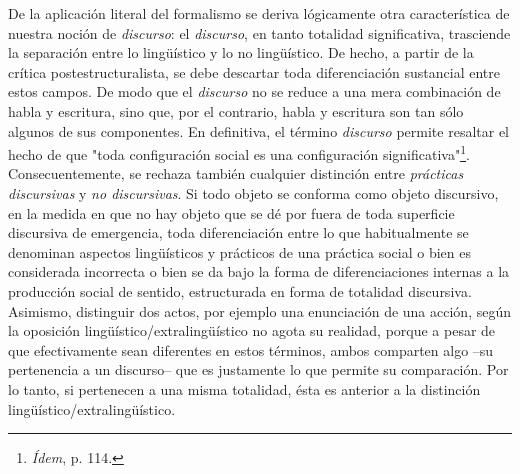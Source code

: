 \documentclass{book}
\begin{document}
De la aplicación literal del formalismo se deriva lógicamente otra
característica de nuestra noción de \emph{discurso}: el \emph{discurso},
en tanto totalidad significativa, trasciende la separación entre lo
lingüístico y lo no lingüístico. De hecho, a partir de la crítica
postestructuralista, se debe descartar toda diferenciación sustancial
entre estos campos. De modo que el \emph{discurso} no se reduce a una
mera combinación de habla y escritura, sino que, por el contrario, habla
y escritura son tan sólo algunos de sus componentes. En definitiva, el
término \emph{discurso} permite resaltar el hecho de que "toda
configuración social es una configuración significativa"\footnote{\emph{Ídem},
  p. 114.}. Consecuentemente, se rechaza también cualquier distinción
entre \emph{prácticas discursivas} y \emph{no discursivas}. Si todo
objeto se conforma como objeto discursivo, en la medida en que no hay
objeto que se dé por fuera de toda superficie discursiva de emergencia,
toda diferenciación entre lo que habitualmente se denominan aspectos
lingüísticos y prácticos de una práctica social o bien es considerada
incorrecta o bien se da bajo la forma de diferenciaciones internas a la
producción social de sentido, estructurada en forma de totalidad
discursiva. Asimismo, distinguir dos actos, por ejemplo una enunciación
de una acción, según la oposición lingüístico/extralingüístico no agota
su realidad, porque a pesar de que efectivamente sean diferentes en
estos términos, ambos comparten algo --su pertenencia a un discurso--
que es justamente lo que permite su comparación. Por lo tanto, si
pertenecen a una misma totalidad, ésta es anterior a la distinción
lingüístico/extralingüístico.
\end{document}
